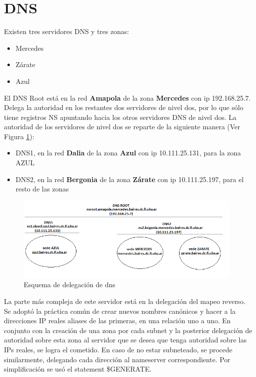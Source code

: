 \section{DNS}

Existen tres servidores DNS y tres zonas: 
\begin{itemize}	
	\item Mercedes 
	\item Zárate 
	\item	Azul
\end{itemize}

El DNS Root está en la red \textbf{Amapola} de la zona \textbf{Mercedes} con ip 192.168.25.7. Delega la autoridad en los restantes dos 
servidores de nivel dos, por lo que sólo tiene registros NS apuntando hacia los otros servidores DNS de nivel dos. La autoridad de los 
servidores de nivel dos se reparte de la siguiente manera (Ver Figura \ref{dns001}): \\

\begin{itemize}
 \item DNS1, en la red \textbf{Dalia} de la zona \textbf{Azul} con ip 10.111.25.131, para la zona AZUL
 \item DNS2, en la red \textbf{Bergonia} de la zona \textbf{Zárate} con ip 10.111.25.197, para el resto de las zonas
\end{itemize}

\begin{figure}[!htpb]
      \centering
      \begin{center}
      \includegraphics[width=11cm]{Imagenes/dns.png}
      \end{center}
      \caption{Esquema de delegación de dns}
      \label{dns001}
\end{figure}

\indent La parte más compleja de este servidor está en la delegación del mapeo reverso. Se adoptó la práctica común de crear nuevos 
nombres canónicos y hacer a la direcciones IP reales aliases de las primeras, en una relación uno a uno. En conjunto con la creación 
de una zona por cada subnet y la posterior delegación de autoridad sobre esta zona al servidor que se desea que tenga autoridad sobre 
las IPs reales, se logra el cometido. En caso de no estar subneteado, se procede similarmente, delegando cada dirección al nameserver 
correspondiente. Por simplificación se usó el statement \$GENERATE. \\


